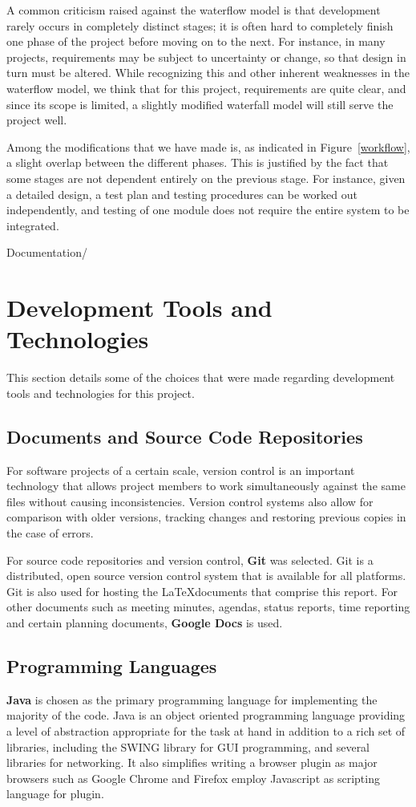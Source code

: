 A common criticism raised against the waterflow model is that development rarely occurs in completely distinct stages; it is often hard to completely finish one phase of the project before moving on to the next. For instance, in many projects, requirements may be subject to uncertainty or change, so that design in turn must be altered. While recognizing this and other inherent weaknesses in the waterflow model, we think that for this project, requirements are quite clear, and since its scope is limited, a slightly modified waterfall model will still serve the project well. 

Among the modifications that we have made is, as indicated in Figure~\ref{workflow}, a slight overlap between the different phases. This is justified by the fact that some stages are not dependent entirely on the previous stage. For instance, given a detailed design, a test plan and testing procedures can be worked out independently, and testing of one module does not require the entire system to be integrated.


Documentation/
\section{Development Tools and Technologies}\label{DevTools}
This section details some of the choices that were made regarding development tools and technologies for this project.

\subsection{Documents and Source Code Repositories}
For software projects of a certain scale, version control is an important technology that allows project members to work simultaneously against the same files without causing inconsistencies. Version control systems also allow for comparison with older versions, tracking changes and restoring previous copies in the case of errors.

For source code repositories and version control, \textbf{Git} was selected. Git is a distributed, open source version control system that is available for all platforms. Git is also used for hosting the \LaTeX documents that comprise this report. For other documents such as meeting minutes, agendas, status reports, time reporting and certain planning documents, \textbf{Google Docs} is used.


\subsection{Programming Languages}
\textbf{Java} is chosen as the primary programming language for implementing the majority of the code. Java is an object oriented programming language providing a level of abstraction appropriate for the task at hand in addition to a rich set of libraries, including the SWING library for GUI programming, and several libraries for networking. It also simplifies writing a browser plugin as major browsers such as Google Chrome and Firefox employ Javascript as scripting language for plugin.

